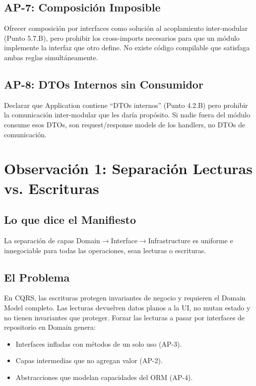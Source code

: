 \documentclass[12pt,a4paper]{article}
\begin{document}
\subsection{AP-7: Composici\'on Imposible}
Ofrecer composici\'on por interfaces como soluci\'on al acoplamiento inter-modular (Punto 5.7.B), pero prohibir los cross-imports necesarios para que un m\'odulo implemente la interfaz que otro define. No existe c\'odigo compilable que satisfaga ambas reglas simult\'aneamente.

\subsection{AP-8: DTOs Internos sin Consumidor}
Declarar que Application contiene ``DTOs internos'' (Punto 4.2.B) pero prohibir la comunicaci\'on inter-modular que les dar\'ia prop\'osito. Si nadie fuera del m\'odulo consume esos DTOs, son request/response models de los handlers, no DTOs de comunicaci\'on.


\section{Observaci\'on 1: Separaci\'on Lecturas vs. Escrituras}

\subsection{Lo que dice el Manifiesto}
La separaci\'on de capas Domain$\to$Interface$\to$Infrastructure es uniforme e innegociable para todas las operaciones, sean lecturas o escrituras.

\subsection{El Problema}
En CQRS, las escrituras protegen invariantes de negocio y requieren el Domain Model completo. Las lecturas devuelven datos planos a la UI, no mutan estado y no tienen invariantes que proteger. Forzar las lecturas a pasar por interfaces de repositorio en Domain genera:
\begin{itemize}[leftmargin=2em]
    \item Interfaces infladas con m\'etodos de un solo uso (AP-3).
    \item Capas intermedias que no agregan valor (AP-2).
    \item Abstracciones que modelan capacidades del ORM (AP-4).
\end{itemize}
\end{document}
